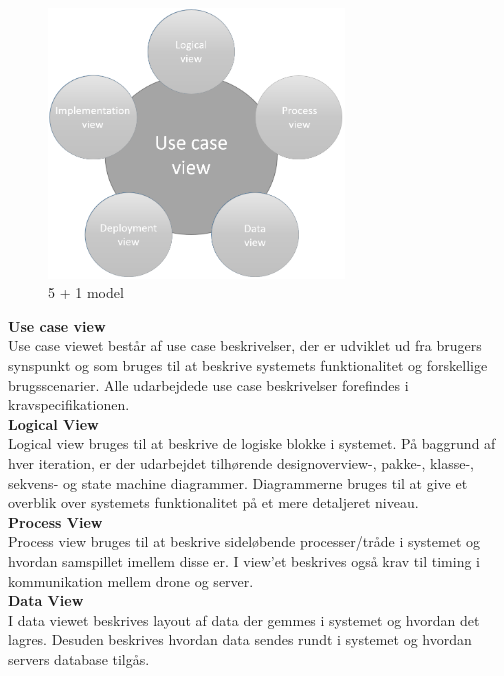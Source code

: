 \begin{figure}[H]
	\centering
	\includegraphics[width=0.7\textwidth]{Billeder/Udviklingsproces/n+1}
	\caption{5 + 1 model}
	\label{fig:n+1}
\end{figure}

\newpage


\textbf{Use case view}\\
Use case viewet består af use case beskrivelser, der er udviklet ud fra brugers synspunkt og som bruges til at beskrive systemets funktionalitet og forskellige brugsscenarier. Alle udarbejdede use case beskrivelser forefindes i kravspecifikationen. \\

\textbf{Logical View}\\
Logical view bruges til at beskrive de logiske blokke i systemet. På baggrund af hver iteration, er der udarbejdet tilhørende designoverview-, pakke-, klasse-, sekvens- og state machine diagrammer. Diagrammerne bruges til at give et overblik over systemets funktionalitet på et mere detaljeret niveau.\\


\textbf{Process View}\\
Process view bruges til at beskrive sideløbende processer/tråde i systemet og hvordan samspillet imellem disse er. I view'et beskrives også krav til timing i kommunikation mellem drone og server.\\


\textbf{Data View}\\
I data viewet beskrives layout af data der gemmes i systemet og hvordan det lagres. Desuden beskrives hvordan data sendes rundt i systemet og hvordan servers database tilgås.\\


